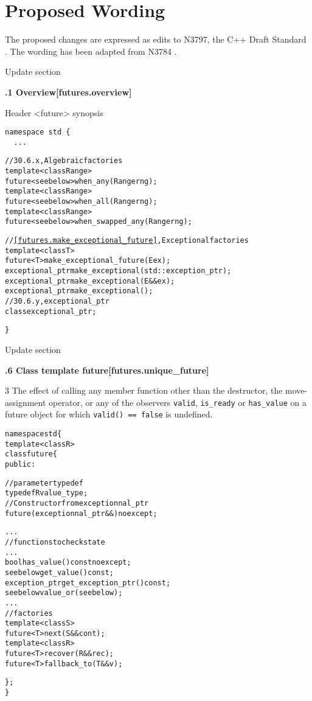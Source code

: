 \documentclass[a4paper,10pt]{article}
\newcommand{\wordingUpdateSubSubSec}[2]{\vspace{15pt}
\noindent
{\textbf{\quad #1\hfill\textbf{[#2]}}}
\label{#2}
\vspace{7pt}
}
\newcommand{\cpp}[1]{\lstinline{#1}}
\newcommand{\add}[1]{\textcolor{dkgreen}{#1}}
\newcommand{\suppress}[1]{\colorbox{suppress_color}{#1}}
\newcommand{\update}[1]{\colorbox{update_color}{#1}}
\begin{document}
\section{Proposed Wording}

The proposed changes are expressed as edits to N3797, the C++ Draft Standard \cite{CXX_DRAFT}. The wording has been adapted from N3784  \cite{N3784}.

\noindent
Update section

\wordingUpdateSubSubSec{30.6.1 Overview}{futures.overview}

\noindent
Header <future> synopsis

\begin{lstlisting}[xleftmargin=0pt]
namespace std {
  ...
\end{lstlisting}
\begin{alltt}
\add{
  // 30.6.x, Algebraic factories
  template <class Range>
  future<see below> when_any(Range rng);
  template <class Range>
  future<see below> when_all(Range rng);
\update{  template <class Range>}
\update{  future<see below> when_swapped_any(Range rng);}
  
  // \ref{futures.make_exceptional_future},  Exceptional factories
\suppress{  template <class T>}
\suppress{  future<T> make_exceptional_future(E ex);  }
\update{  exceptional_ptr make_exceptional(std::exception_ptr);  }
\update{  exceptional_ptr make_exceptional(E&& ex);  }
\update{  exceptional_ptr make_exceptional();  }
\update{  // 30.6.y, exceptional_ptr  }
\update{  class exceptional_ptr;  }

}  
\end{alltt}
\begin{lstlisting}[xleftmargin=0pt]
}
\end{lstlisting}

\noindent
Update section

\wordingUpdateSubSubSec{30.6.6 Class template future}{futures.unique_future}

3 The effect of calling any member function other than the destructor, the move-assignment operator, or \add{any of the observers} \cpp{valid}, \cpp{is_ready} or \add{\cpp{has_value}} on a future object for which \cpp{valid() == false} is undefined.

\begin{alltt}
namespace std \{
  template <class R>
  class future \{
  public:
\add{
    // parameter typedef
    typedef R value_type;
\update{    // Constructor from exceptionnal_ptr }
\update{    future(exceptionnal_ptr&&) noexcept;  }

  ...
    // functions to check state
    ...
    bool has_value() const noexcept;
\suppress{    see below get_value() const;}
    exception_ptr get_exception_ptr() const;
    see below value_or(see below);
  ...
    // factories
    template <class S>
      future<T> next(S&& cont);
    template <class R>
      future<T> recover(R&& rec);
    future<T> fallback_to(T&& v);
}
  \};
\}
\end{alltt}
\end{document}
